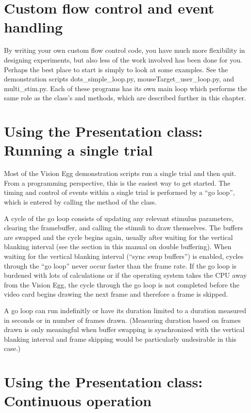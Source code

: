 \documentclass{manual}
\begin{document}
\section{Custom flow control and event handling}

By writing your own custom flow control code, you have much more
flexibility in designing experiments, but also less of the work
involved has been done for you.  Perhaps the best place to start is
simply to look at some examples.  See the demonstration scripts
dots_simple_loop.py, mouseTarget_user_loop.py, and multi_stim.py.
Each of these programs has its own main loop which performs the same
role as the  class's  and
 methods, which are described further in this chapter.

\section{Using the Presentation class: Running a single trial}

Most of the Vision Egg demonstration scripts run a single trial and
then quit. From a programming perspective, this is the easiest way to
get started. The timing and control of events within a single trial is
performed by a ``go loop'', which is entered by calling the
 method of the  class.

A cycle of the go loop consists of updating any relevant stimulus
parameters, clearing the framebuffer, and calling the stimuli to draw
themselves.  The buffers are swapped and the cycle begins again,
usually after waiting for the vertical blanking interval (see the
section in this manual on double buffering).  When waiting for the
vertical blanking interval (``sync swap buffers'') is enabled, cycles
through the ``go loop'' never occur faster than the frame rate.  If
the go loop is burdened with lots of calculations or if the operating
system takes the CPU away from the Vision Egg, the cycle through the
go loop is not completed before the video card begins drawing the next
frame and therefore a frame is skipped.

A go loop can run indefinitly or have its duration limited to a
duration measured in seconds or in number of frames drawn.  (Measuring
duration based on frames drawn is only meaningful when buffer swapping
is synchronized with the vertical blanking interval and frame skipping
would be particularly undesirable in this case.)

\section{Using the Presentation class: Continuous operation}
\end{document}
